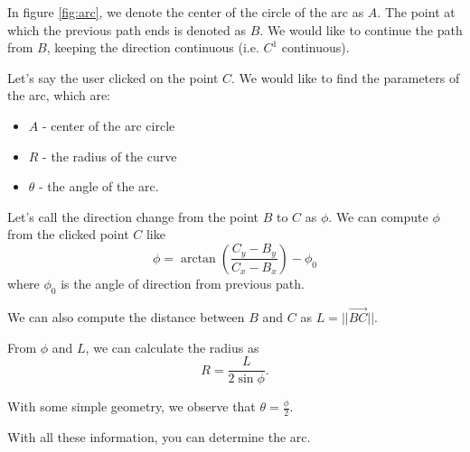 \documentclass{article}
\begin{document}
In figure \ref{fig:arc}, we denote the center of the circle of the arc as $A$.
The point at which the previous path ends is denoted as $B$.
We would like to continue the path from $B$, keeping the direction continuous (i.e. $C^1$ continuous).

Let's say the user clicked on the point $C$.
We would like to find the parameters of the arc, which are:
\begin{itemize}
    \item $A$ - center of the arc circle
    \item $R$ - the radius of the curve
    \item $\theta$ - the angle of the arc.
\end{itemize}

Let's call the direction change from the point $B$ to $C$ as $\phi$.
We can compute $\phi$ from the clicked point $C$ like
$$
\phi = \arctan\left({\frac{C_y - B_y}{C_x - B_x}}\right) - \phi_0
$$
where $\phi_0$ is the angle of direction from previous path.

We can also compute the distance between $B$ and $C$ as $L = ||\vec{BC}||$.

From $\phi$ and $L$, we can calculate the radius as
$$
R = \frac{L}{2 \sin\phi}.
$$

With some simple geometry, we observe that $\theta=\frac{\phi}{2}$.

With all these information, you can determine the arc.
\end{document}
